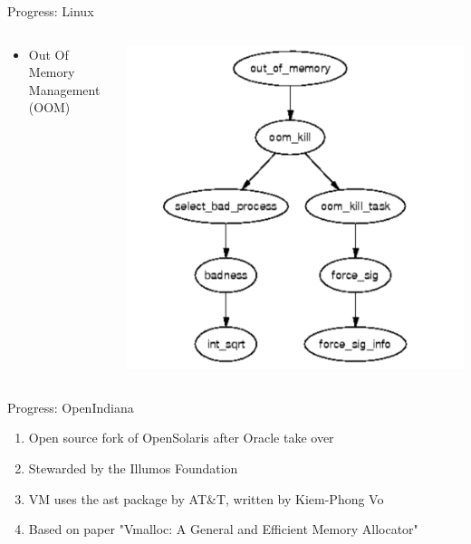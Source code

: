 \documentclass[aspectratio=169]{beamer}
\newcommand{\bi}{\begin{itemize}}
\newcommand{\ei}{\end{itemize}}
\begin{document}
\begin{frame}{Progress: Linux}
  \begin{columns}[T]
    \begin{column}{0.6\textwidth}
      \bi
    \item Out Of Memory Management (OOM)
      \ei
    \end{column}
    \begin{column}{0.4\textwidth}
      \includegraphics[scale=0.35]{./figures/linux4.png}
    \end{column}
  \end{columns}
\end{frame}

\begin{frame}{Progress: OpenIndiana}
    \begin{enumerate}
        \item Open source fork of OpenSolaris after Oracle take over
        \item Stewarded by the Illumos Foundation
        \item VM uses the ast package by AT\&T, written by Kiem-Phong Vo
        \item Based on paper "Vmalloc: A General and Efficient Memory Allocator"
    \end{enumerate}
\end{frame}
\end{document}
